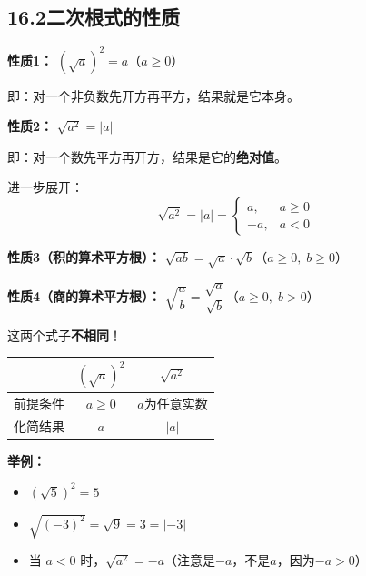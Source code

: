 \documentclass[12pt, a4paper]{ctexart}
\begin{document}
\subsection*{16.2\quad 二次根式的性质}

\begin{knowledgebox}[二次根式的基本性质]
\textbf{性质1：} $(\sqrt{a})^2 = a$（$a \geqslant 0$）

\medskip
即：对一个非负数先开方再平方，结果就是它本身。

\bigskip
\textbf{性质2：} $\sqrt{a^2} = |a|$

\medskip
即：对一个数先平方再开方，结果是它的\textbf{绝对值}。

\medskip
进一步展开：
\[
\sqrt{a^2} = |a| = \begin{cases} a, & a \geqslant 0 \\ -a, & a < 0 \end{cases}
\]

\medskip
\textbf{性质3（积的算术平方根）：} $\sqrt{ab} = \sqrt{a} \cdot \sqrt{b}$（$a \geqslant 0,\; b \geqslant 0$）

\medskip
\textbf{性质4（商的算术平方根）：} $\sqrt{\dfrac{a}{b}} = \dfrac{\sqrt{a}}{\sqrt{b}}$（$a \geqslant 0,\; b > 0$）
\end{knowledgebox}

\begin{warnbox}
这两个式子\textbf{不相同}！

\begin{center}
\renewcommand{\arraystretch}{1.6}
\begin{tabular}{lcc}
\toprule
 & $(\sqrt{a})^2$ & $\sqrt{a^2}$ \\
\midrule
前提条件 & $a \geqslant 0$ & $a$为任意实数 \\
化简结果 & $a$ & $|a|$ \\
\bottomrule
\end{tabular}
\end{center}

\medskip
\textbf{举例：}
\begin{itemize}[leftmargin=2em]
  \item $(\sqrt{5})^2 = 5$
  \item $\sqrt{(-3)^2} = \sqrt{9} = 3 = |-3|$
  \item 当 $a < 0$ 时，$\sqrt{a^2} = -a$（注意是$-a$，不是$a$，因为$-a > 0$）
\end{itemize}
\end{warnbox}
\end{document}
